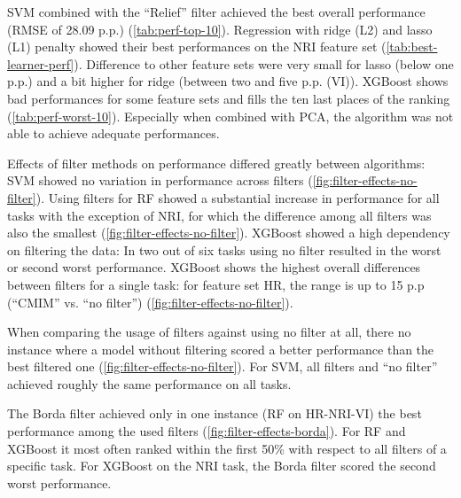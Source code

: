 \documentclass[final]{IEEEtran}
\begin{document}
SVM combined with the \enquote{Relief} filter achieved the best overall performance (RMSE of 28.09 p.p.) (\autoref{tab:perf-top-10}).
Regression with ridge (L2) and lasso (L1) penalty showed their best performances on the NRI feature set (\autoref{tab:best-learner-perf}).
Difference to other feature sets were very small for lasso (below one p.p.) and a bit higher for ridge (between two and five p.p. (VI)).
XGBoost shows bad performances for some feature sets and fills the ten last places of the ranking (\autoref{tab:perf-worst-10}).
Especially when combined with PCA, the algorithm was not able to achieve adequate performances.

Effects of filter methods on performance differed greatly between algorithms:
SVM showed no variation in performance across filters (\autoref{fig:filter-effects-no-filter}).
Using filters for RF showed a substantial increase in performance for all tasks with the exception of NRI, for which the difference among all filters was also the smallest (\autoref{fig:filter-effects-no-filter}).
XGBoost showed a high dependency on filtering the data: In two out of six tasks using no filter resulted in the worst or second worst performance.
XGBoost shows the highest overall differences between filters for a single task: for feature set HR, the range is up to 15 p.p (\enquote{CMIM} vs. \enquote{no filter}) (\autoref{fig:filter-effects-no-filter}).

When comparing the usage of filters against using no filter at all, there no instance where a model without filtering scored a better performance than the best filtered one (\autoref{fig:filter-effects-no-filter}).
For SVM, all filters and \enquote{no filter} achieved roughly the same performance on all tasks.

The Borda filter achieved only in one instance (RF on HR-NRI-VI) the best performance among the used filters (\autoref{fig:filter-effects-borda}).
For RF and XGBoost it most often ranked within the first 50\% with respect to all filters of a specific task.
For XGBoost on the NRI task, the Borda filter scored the second worst performance.
\end{document}
